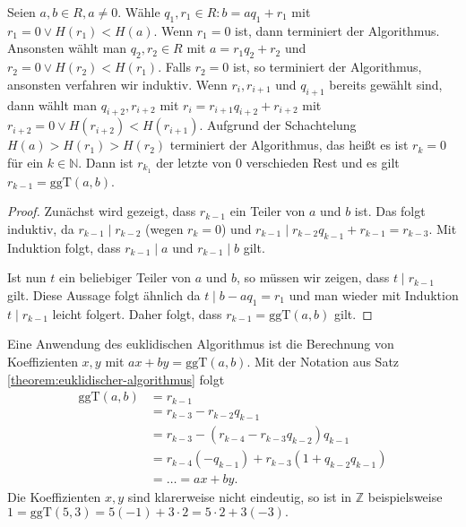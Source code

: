 \begin{theorem}\label{theorem:euklidischer-algorithmus}
    Seien $a,b\in R, a\neq 0$. Wähle $q_1,r_1\in R:b=aq_1+r_1$ mit $r_1=0\lor H(r_1)<H(a)$. Wenn $r_1=0$ ist, dann terminiert der Algorithmus. Ansonsten wählt man $q_2,r_2\in R$ mit
    $a=r_1q_2+r_2$ und $r_2=0\lor H(r_2)<H(r_1)$. Falls $r_2=0$ ist, so terminiert der Algorithmus, ansonsten verfahren wir induktiv. Wenn $r_i, r_{i+1}$ und $q_{i+1}$ bereits gewählt sind, dann wählt man $q_{i+2},r_{i+2}$ mit $r_i=r_{i+1}q_{i+2}+r_{i+2}$ mit $r_{i+2}=0\lor H(r_{i+2})<H(r_{i+1})$. Aufgrund der Schachtelung $H(a)>H(r_1)>H(r_2)$ terminiert der Algorithmus, das heißt es ist $r_k=0$ für ein $k\in\mathbb{N}$. Dann ist $r_{k_1}$ der letzte von $0$ verschieden Rest und es gilt $r_{k-1}=\mathrm{ggT}(a,b)$.
\end{theorem}

\begin{proof}
    Zunächst wird gezeigt, dass $r_{k-1}$ ein Teiler von $a$ und $b$ ist. Das folgt induktiv,
    da $r_{k-1}\mid r_{k-2}$ (wegen $r_k=0$) und $r_{k-1}\mid r_{k-2}q_{k-1}+r_{k-1}=r_{k-3}$.
    Mit Induktion folgt, dass $r_{k-1}\mid a$ und $r_{k-1}\mid b$ gilt.

    Ist nun $t$ ein beliebiger Teiler von $a$ und $b$, so müssen wir zeigen, dass $t\mid r_{k-1}$ gilt.
    Diese Aussage folgt ähnlich da $t\mid b-aq_1=r_1$ und man wieder mit Induktion $t\mid r_{k-1}$ leicht folgert.
    Daher folgt, dass $r_{k-1}=\mathrm{ggT}(a,b)$ gilt. 
\end{proof}

\begin{remark}
    Eine Anwendung des euklidischen Algorithmus ist die Berechnung von Koeffizienten $x,y$ mit
    $ax+by=\mathrm{ggT}(a,b)$. Mit der Notation aus Satz \ref{theorem:euklidischer-algorithmus} folgt
    \begin{align*}
        \mathrm{ggT}(a,b)&=r_{k-1}\\
        &=r_{k-3}-r_{k-2}q_{k-1}\\
        &=r_{k-3}-(r_{k-4}-r_{k-3}q_{k-2})q_{k-1}\\
        &=r_{k-4}(-q_{k-1})+r_{k-3}(1+q_{k-2}q_{k-1})\\
        &=\ldots=ax+by.
    \end{align*}
    Die Koeffizienten $x,y$ sind klarerweise nicht eindeutig, so ist in $\mathbb{Z}$ beispielsweise
    $1=\mathrm{ggT}(5,3)=5(-1)+3\cdot2=5\cdot 2+3(-3).$
\end{remark}

